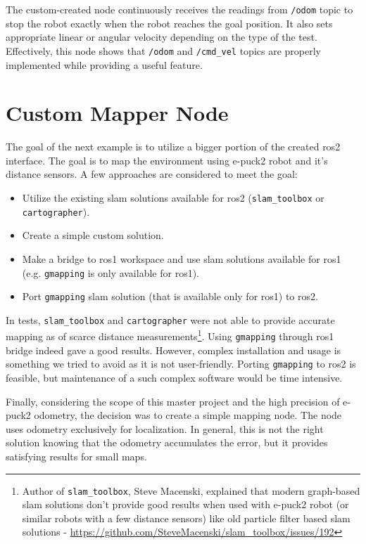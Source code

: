The custom-created node continuously receives the readings from \texttt{/odom} topic to stop the robot exactly when the robot reaches the goal position. It also sets appropriate linear or angular velocity depending on the type of the test. Effectively, this node shows that \texttt{/odom} and \texttt{/cmd\_vel} topics are properly implemented while providing a useful feature.

\section{Custom Mapper Node}
The goal of the next example is to utilize a bigger portion of the created \ac{ros2} interface. The goal is to map the environment using e-puck2 robot and it's distance sensors. A few approaches are considered to meet the goal:
\begin{itemize}
    \item Utilize the existing \ac{slam} solutions available for \ac{ros2} (\texttt{slam\_toolbox} or \texttt{cartographer}).
    \item Create a simple custom solution.
    \item Make a bridge to \ac{ros}1 workspace and use \ac{slam} solutions available for \ac{ros}1 (e.g. \texttt{gmapping} is only available for \ac{ros}1).
    \item Port \texttt{gmapping} \ac{slam} solution (that is available only for \ac{ros}1) to \ac{ros2}.
\end{itemize}

In tests, \texttt{slam\_toolbox} and \texttt{cartographer} were not able to provide accurate mapping as of scarce distance measurements\footnote{Author of \texttt{slam\_toolbox}, Steve Macenski, explained that modern graph-based \ac{slam} solutions don't provide good results when used with e-puck2 robot (or similar robots with a few distance sensors) like old particle filter based \ac{slam} solutions - \url{https://github.com/SteveMacenski/slam_toolbox/issues/192}}. Using \texttt{gmapping} through \ac{ros}1 bridge indeed gave a good results. However, complex installation and usage is something we tried to avoid as it is not user-friendly. Porting \texttt{gmapping} to \ac{ros2} is feasible, but maintenance of a such complex software would be time intensive.

Finally, considering the scope of this master project and the high precision of e-puck2 odometry, the decision was to create a simple mapping node. The node uses odometry exclusively for localization. In general, this is not the right solution knowing that the odometry accumulates the error, but it provides satisfying results for small maps. 

